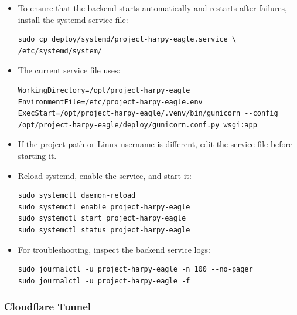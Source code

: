 \documentclass[12pt,a4paper]{article}
\begin{document}
\begin{itemize}
    \item To ensure that the backend starts automatically and restarts after failures, install the systemd service file:
\begin{lstlisting}
sudo cp deploy/systemd/project-harpy-eagle.service \
/etc/systemd/system/
\end{lstlisting}

    \item The current service file uses:
\begin{lstlisting}
WorkingDirectory=/opt/project-harpy-eagle
EnvironmentFile=/etc/project-harpy-eagle.env
ExecStart=/opt/project-harpy-eagle/.venv/bin/gunicorn --config /opt/project-harpy-eagle/deploy/gunicorn.conf.py wsgi:app
\end{lstlisting}

    \item If the project path or Linux username is different, edit the service file before starting it.
    \item Reload systemd, enable the service, and start it:
\begin{lstlisting}
sudo systemctl daemon-reload
sudo systemctl enable project-harpy-eagle
sudo systemctl start project-harpy-eagle
sudo systemctl status project-harpy-eagle
\end{lstlisting}

    \item For troubleshooting, inspect the backend service logs:
\begin{lstlisting}
sudo journalctl -u project-harpy-eagle -n 100 --no-pager
sudo journalctl -u project-harpy-eagle -f
\end{lstlisting}
\end{itemize}

\subsubsection{Cloudflare Tunnel}
\end{document}
